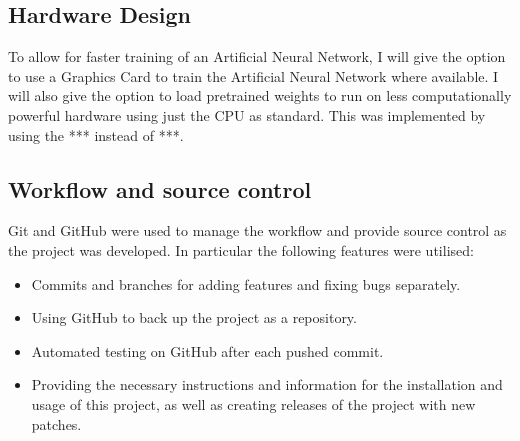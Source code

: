\documentclass[./project-report/src/latex/project-report.tex]{subfiles}
\begin{document}
\subsection{Hardware Design}

To allow for faster training of an Artificial Neural Network, I will give the option to use a Graphics Card to train the Artificial Neural Network where available. 
I will also give the option to load pretrained weights to run on less computationally powerful hardware using just the CPU as standard. This was implemented by using the *** 
instead of ***.

\subsection{Workflow and source control}

Git and GitHub were used to manage the workflow and provide source control as the project was developed. In particular the following features were utilised:

\begin{itemize}
    \item Commits and branches for adding features and fixing bugs separately.
    \item Using GitHub to back up the project as a repository.
    \item Automated testing on GitHub after each pushed commit.
    \item Providing the necessary instructions and information for the installation and usage of this project, as well as creating releases of the project with new patches.
\end{itemize}
\end{document}
